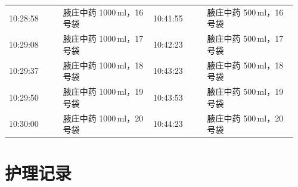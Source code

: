 \documentclass[UTF8,10pt,a4paper,fontset=fandol]{ctexart}
\begin{document}
\begin{center}
\begin{tabular}{p{0.18\linewidth}p{0.30\linewidth}p{0.18\linewidth}p{0.30\linewidth}}
10:28:58 & 腋庄中药 1000\,ml，16号袋 & 10:41:55 & 腋庄中药 500\,ml，16号袋 \\
10:29:08 & 腋庄中药 1000\,ml，17号袋 & 10:42:23 & 腋庄中药 500\,ml，17号袋 \\
10:29:37 & 腋庄中药 1000\,ml，18号袋 & 10:43:23 & 腋庄中药 500\,ml，18号袋 \\
10:29:50 & 腋庄中药 1000\,ml，19号袋 & 10:43:53 & 腋庄中药 500\,ml，19号袋 \\
10:30:00 & 腋庄中药 1000\,ml，20号袋 & 10:44:23 & 腋庄中药 500\,ml，20号袋 \\
\end{tabular}
\end{center}


\newpage

\section{护理记录}
\end{document}
